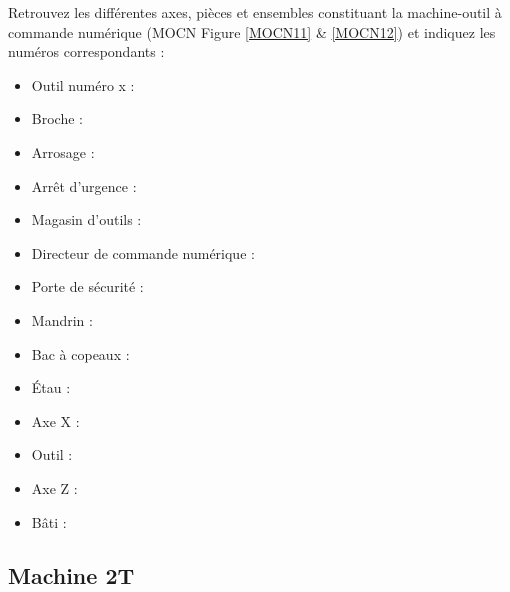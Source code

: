\documentclass[12pt]{article}
\newcounter{exo}
\newenvironment{exo}{\stepcounter{exo}\vspace{0.5cm}{\bfseries Question \theexo\ :}}{\par\vspace{0.5cm}}
\begin{document}
\begin{exo}\label{exo1} Retrouvez les différentes axes, pièces et ensembles constituant la machine-outil à commande numérique (MOCN Figure \ref{MOCN11} \& \ref{MOCN12}) et indiquez les numéros correspondants :\\ \end{exo}
\begin{minipage}{.55\linewidth}
\begin{itemize}
    \item Outil numéro x :
    \item Broche :
    \item Arrosage :
    \item Arrêt d’urgence :
    \item Magasin d’outils :
    \item Directeur de commande numérique :
    \item Porte de sécurité :
\end{itemize}

\end{minipage}
\begin{minipage}{.44\linewidth}
\begin{itemize}
    \item Mandrin :
    \item Bac à copeaux :
    \item Étau :
    \item Axe X :
    \item Outil :
    \item Axe Z :
    \item Bâti :
\end{itemize}
\end{minipage}













\subsection{Machine 2T}
\end{document}
